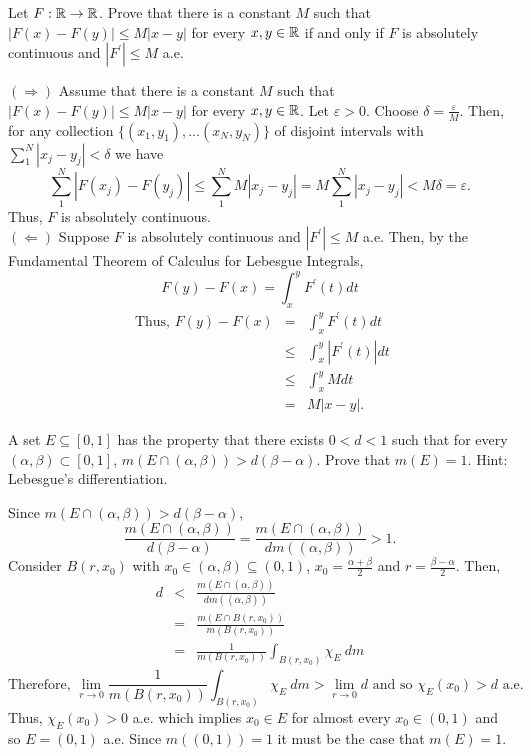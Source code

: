 \begin{list}
 \item Let $F: {\mathbb R} \rightarrow {\mathbb R}$. Prove that there is a constant $M$ such that $|F(x)-F(y)|\leq M|x-y|$ for every $x, y \in {\mathbb R}$ if and only if $F$ is absolutely continuous and $|F^{'}|\leq M$ a.e.
 \begin{pf}
 	$(\Rightarrow) $ Assume that there is a constant $M$ such that $|F(x)-F(y)|\leq M|x-y|$ for every $x, y \in {\mathbb R}$. Let $\varepsilon>0$. Choose $\delta = \frac{\varepsilon}{M}$. Then, for any collection $\{(x_1, y_1), \dots (x_N, y_N)\}$ of disjoint intervals with $\sum_1^N |x_j - y_j| < \delta$ we have
 	\[
 	\sum_1^N |F(x_j) - F(y_j)| \leq \sum_1^N M |x_j - y_j| = M\sum_1^N  |x_j - y_j| < M \delta = \varepsilon.
 	\]  
 	Thus, $F$ is absolutely continuous.\\
 	$( \Leftarrow )$ Suppose $F$ is absolutely continuous and $|F^{'}|\leq M$ a.e. Then, by the Fundamental Theorem of Calculus for Lebesgue Integrals, \[
 	F(y) - F(x) = \int_x^y F^{'}(t) dt
 	\]
 	\begin{eqnarray*}
\text{	Thus, } F(y) - F(x) &=& \int_x^y F^{'}(t) dt\\
 		& \leq & \int_x^y |F^{'}(t)| dt \\
 		& \leq &  \int_x^y M dt \\
 		& = & M |x-y|. 
 	\end{eqnarray*}
 \end{pf}

 \item A set $E \subseteq [0,1]$ has the property that there exists $0<d<1$ such that for every $(\alpha, \beta)\subset [0,1]$, $m(E \cap (\alpha, \beta))>d(\beta-\alpha)$. Prove that $m(E)=1$. Hint: Lebesgue's differentiation.
 \begin{pf}
Since $m(E \cap (\alpha, \beta))>d(\beta-\alpha)$, \[
\frac{m(E \cap (\alpha, \beta))}{d(\beta-\alpha)}=\frac{m(E \cap (\alpha, \beta))}{dm((\alpha, \beta))}>1.
\]
Consider $B(r, x_0)$ with $x_0 \in (\alpha, \beta) \subseteq (0,1)$, $x_0 = \frac{\alpha+ \beta}{2}$ and $r = \frac{\beta - \alpha}{2}$. Then, \begin{eqnarray*}
 	d & < & \frac{m(E \cap (\alpha, \beta))}{dm((\alpha, \beta))} \\
 	&=& \frac{m(E \cap B(r, x_0))}{ m(B(r, x_0))} \\
 	& = & \frac{1}{m(B(r, x_0))} \int_{B(r, x_0)} \chi_E \  dm 
 \end{eqnarray*}
 \[
\text{Therefore, } \lim_{r \rightarrow 0} \frac{1}{m(B(r, x_0))} \int_{B(r, x_0)} \chi_E \  dm > \lim_{r \rightarrow 0}d \text{ and so } \chi_E(x_0) > d \text{ a.e. }
\]
Thus, $\chi_E(x_0)>0$ a.e. which implies $x_0 \in E$ for almost every $x_0 \in (0,1)$ and so $E = (0,1)$ a.e. Since $m((0,1))=1$ it must be the case that $m(E)=1$.
 \end{pf}

 \end{list}